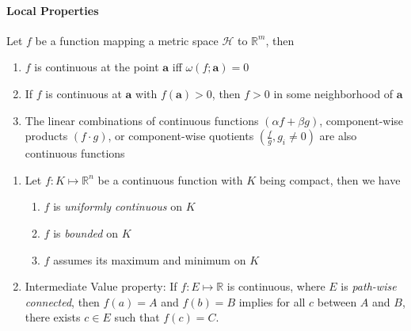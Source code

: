 \paragraph{Local Properties}
\begin{proposition}
Let $f$ be a function mapping a metric space $\mathcal{H}$ to $\mathbb{R}^m$, then
\begin{enumerate}
\item
$f$ is continuous at the point $\bm a$ iff $\omega(f;\bm a)=0$
\item
If $f$ is continuous at $\bm a$ with $f(\bm a)>0$, then $f>0$ in some neighborhood of $\bm a$
\item
The linear combinations of continuous functions $(\alpha f+\beta g)$, component-wise products $(f\cdot g)$, or component-wise quotients $(\frac{f}{g},g_i\ne0)$ are also continuous functions
\end{enumerate}
\end{proposition}
\begin{proposition}
\begin{enumerate}
\item
Let $f:K\mapsto\mathbb{R}^n$ be a continuous function with $K$ being compact, then we have
\begin{enumerate}
\item
$f$ is \emph{uniformly continuous} on $K$
\item
$f$ is \emph{bounded} on $K$
\item
$f$ assumes its maximum and minimum on $K$
\end{enumerate}
\item
Intermediate Value property: If $f:E\mapsto\mathbb{R}$ is continuous, where $E$ is \emph{path-wise connected}, then $f(a)=A$ and $f(b)=B$ implies for all $c$ between $A$ and $B$, there exists $c\in E$ such that $f(c)=C$.
\end{enumerate}
\end{proposition}
